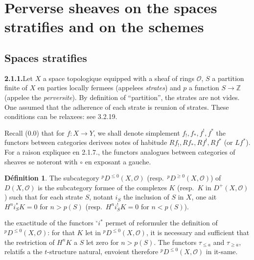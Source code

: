 \documentclass[12pt,a4paper]{article}
\theoremstyle{plain}
\theoremstyle{definition}
\newtheorem{definition}[theorem]{D\'efinition}
\begin{document}
\section{Perverse sheaves on the spaces stratifies and on the schemes}

\subsection{Spaces stratifies}

\noindent\textbf{2.1.1.}\quad Let $X$ a space topologique equipped with a sheaf of rings $\mathcal{O}$, $S$ a partition finite of $X$ en parties locally fermees (appelees \emph{strates}) and $p$ a function $S \to \mathbb{Z}$ (appelee the \emph{perversite}). By definition of ``partition'', the strates are not vides. One assumed that the adherence of each strate is reunion of strates. These conditions can be relaxees: see 3.2.19.

Recall (0.0) that for $f : X \to Y$, we shall denote simplement $f_!, f_*, f^!, f^*$ the functors between categories derivees notes of habitude $Rf_!, Rf_*, Rf^!, Rf^*$ (or $Lf^*$). For a raison expliquee en 2.1.7., the functors analogues between categories of sheaves se noteront with $\circ$ en exposant a gauche.

\begin{definition}\label{def:2.1.2}
The subcategory ${}^p D^{\leqslant 0}(X, \mathcal{O})$ (resp.\ ${}^p D^{\geqslant 0}(X, \mathcal{O})$) of $D(X, \mathcal{O})$ is the subcategory formee of the complexes $K$ (resp.\ $K$ in $D^+(X, \mathcal{O})$) such that for each strate $S$, notant $i_S$ the inclusion of $S$ in $X$, one ait $H^n i_S^* K = 0$ for $n > p(S)$ (resp.\ $H^n i_S^! K = 0$ for $n < p(S)$).
\end{definition}

the exactitude of the functors ${}^\circ i^*$ permet of reformuler the definition of ${}^p D^{\leqslant 0}(X, \mathcal{O})$: for that $K$ let in ${}^p D^{\leqslant 0}(X, \mathcal{O})$, it is necessary and sufficient that the restriction of $H^n K$ a $S$ let zero for $n > p(S)$. The functors $\tau_{\leqslant a}$ and $\tau_{\geqslant a}$, relatifs a the $t$-structure natural, envoient therefore ${}^p D^{\leqslant 0}(X, \mathcal{O})$ in it-same.
\end{document}
